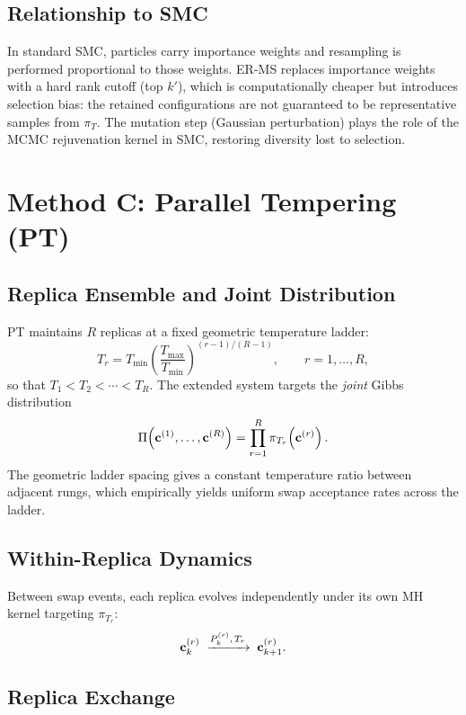 \subsection{Relationship to SMC}

In standard SMC, particles carry importance weights and resampling is
performed proportional to those weights.
ER-MS replaces importance weights with a hard rank cutoff (top $k'$),
which is computationally cheaper but introduces selection bias:
the retained configurations are not guaranteed to be representative
samples from $\pi_T$.
The mutation step (Gaussian perturbation) plays the role of the MCMC
rejuvenation kernel in SMC, restoring diversity lost to selection.

\section{Method C: Parallel Tempering (PT)}
\label{sec:pt}

\subsection{Replica Ensemble and Joint Distribution}

PT maintains $R$ replicas at a fixed geometric temperature ladder:
\[
  T_r = T_{\min}\!\left(\frac{T_{\max}}{T_{\min}}\right)^{(r-1)/(R-1)},
  \qquad r = 1, \dots, R,
\]
so that $T_1 < T_2 < \cdots < T_R$.
The extended system targets the \emph{joint} Gibbs distribution
\[
  \Pi\!\left(\mathbf{c}^{(1)}, \dots, \mathbf{c}^{(R)}\right)
  = \prod_{r=1}^R \pi_{T_r}\!\left(\mathbf{c}^{(r)}\right).
\]
The geometric ladder spacing gives a constant temperature ratio between
adjacent rungs, which empirically yields uniform swap acceptance rates
across the ladder.

\subsection{Within-Replica Dynamics}

Between swap events, each replica evolves independently under its own
MH kernel targeting $\pi_{T_r}$:
\[
  \mathbf{c}_k^{(r)} \;\xrightarrow{P_k^{(r)},\, T_r}\; \mathbf{c}_{k+1}^{(r)}.
\]

\subsection{Replica Exchange}


